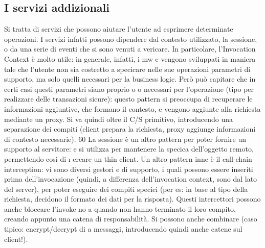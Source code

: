 \subsection{I servizi addizionali}
Si tratta di servizi che possono aiutare l'utente ad esprimere determinate operazioni. I servizi infatti possono
dipendere dal contesto utilizzato, la sessione, o
da una serie di eventi che si sono venuti a vericare.
In particolare, l'Invocation Context è molto utile: in generale, infatti, i mw
e
vengono sviluppati in maniera tale che l'utente non sia costretto a specicare
nelle sue operazioni parametri di supporto, ma solo quelli necessari per la business logic. Però può capitare che in
certi casi questi parametri siano proprio
o
o
necessari per l'operazione (tipo per realizzare delle transazioni sicure): questo
pattern si preoccupa di recuperare le informazioni aggiuntive, che formano il
contesto, e vengono aggiunte alla richiesta mediante un proxy. Si va quindi
oltre il C/S primitivo, introducendo una separazione dei compiti (client prepara
la richiesta, proxy aggiunge informazioni di contesto necessarie).
60
La sessione è un altro pattern per poter fornire un supporto al servitore:
e
si utilizza per mantenere la specica dell'oggetto remoto, permettendo così di
\i{}
creare un thin client.
Un altro pattern inne è il call-chain interception: vi sono diversi gestori
e
di supporto, i quali possono essere inseriti prima dell'invocazione (quindi, a
differenza dell'invocation context, sono dal lato del server), per poter eseguire
dei compiti specici (per es: in base al tipo della richiesta, decidono il formato
dei dati per la risposta). Questi intercettori possono anche bloccare l'invoke no
a quando non hanno terminato il loro compito, creando appunto una catena di
responsabilità. Si possono anche combinare (caso tipico: encrypt/decrypt di
a
messaggi, introducendo quindi anche catene sul client!).
